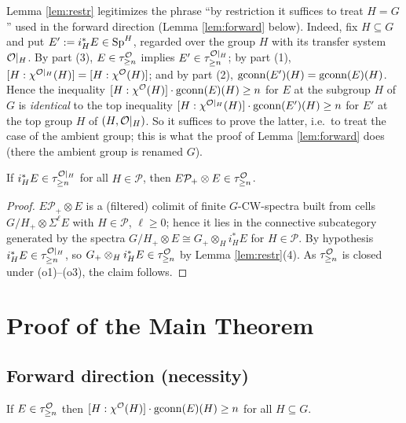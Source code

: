\begin{qfiveremark}\label{rem:reduction}
Lemma \ref{lem:restr} legitimizes the phrase ``by restriction it suffices to
treat $H=G$'' used in the forward direction (Lemma \ref{lem:forward} below).
Indeed, fix $H\subseteq G$ and put $E':=i_H^\ast E\in\mathrm{Sp}^H$, regarded over the
group $H$ with its transfer system $\mathcal{O}|_H$. By part (3), $E\in\tau^{\mathcal{O}}_{\ge n}$
implies $E'\in\tau^{\mathcal{O}|_H}_{\ge n}$; by part (1),
$[H:\chi^{\mathcal{O}|_H}(H)]=[H:\chi^{\mathcal{O}}(H)]$; and by part (2),
$\operatorname{gconn}(E')(H)=\operatorname{gconn}(E)(H)$. Hence the inequality
$[H:\chi^{\mathcal{O}}(H)]\cdot\operatorname{gconn}(E)(H)\ge n$ for $E$ at the subgroup $H$ of $G$ is
\emph{identical} to the top inequality
$[H:\chi^{\mathcal{O}|_H}(H)]\cdot\operatorname{gconn}(E')(H)\ge n$ for $E'$ at the top group $H$
of $(H,\mathcal{O}|_H)$. So it suffices to prove the latter, i.e.\ to treat the case of
the ambient group; this is what the proof of Lemma \ref{lem:forward} does (there
the ambient group is renamed $G$).
\end{qfiveremark}

\begin{qfivelemma}\label{lem:induced}
If $i_H^\ast E\in\tau^{\mathcal{O}|_H}_{\ge n}$ for all $H\in\mathcal P$, then
$E\mathcal P_+\otimes E\in\tau^{\mathcal{O}}_{\ge n}$.
\end{qfivelemma}

\begin{proof}
$E\mathcal P_+\otimes E$ is a (filtered) colimit of finite $G$-CW-spectra built
from cells $G/H_+\otimes\Sigma^\ell E$ with $H\in\mathcal P$, $\ell\ge 0$; hence it
lies in the connective subcategory generated by the spectra
$G/H_+\otimes E\cong G_+\otimes_H i_H^\ast E$ for $H\in\mathcal P$. By hypothesis
$i_H^\ast E\in\tau^{\mathcal{O}|_H}_{\ge n}$, so $G_+\otimes_H i_H^\ast E\in\tau^{\mathcal{O}}_{\ge n}$
by Lemma \ref{lem:restr}(4). As $\tau^{\mathcal{O}}_{\ge n}$ is closed under (o1)--(o3), the claim follows.
\end{proof}

\section*{Proof of the Main Theorem}

\subsection*{Forward direction (necessity)}

\begin{qfivelemma}\label{lem:forward}
If $E\in\tau^{\mathcal{O}}_{\ge n}$ then $[H:\chi^{\mathcal{O}}(H)]\cdot\operatorname{gconn}(E)(H)\ge n$ for all
$H\subseteq G$.
\end{qfivelemma}

